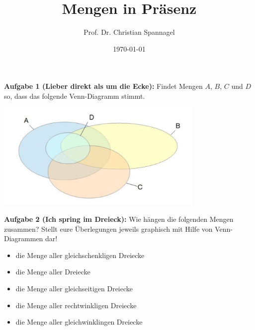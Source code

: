 \documentclass{../cssheet}
\title{Mengen in Präsenz}
\author{Prof. Dr. Christian Spannagel}
\date{\today}
\begin{document}
\printtitle

\vspace*{10mm}


\textbf{Aufgabe 1 (Lieber direkt als um die Ecke):}  Findet Mengen $A$, $B$, $C$ und $D$ so, dass das folgende Venn-Diagramm stimmt.

\begin{center}
\includegraphics[width=10cm]{venn.png}
\end{center}


\textbf{Aufgabe 2 (Ich spring im Dreieck):} Wie hängen die folgenden Mengen zusammen?
Stellt eure Überlegungen jeweils graphisch mit Hilfe von Venn-Diagrammen dar!

\begin{itemize}
\item die Menge aller gleichschenkligen Dreiecke
\item die Menge aller Dreiecke
\item die Menge aller gleichseitigen Dreiecke
\item die Menge aller rechtwinkligen Dreiecke
\item die Menge aller gleichwinklingen Dreiecke
\end{itemize}

\vspace*{10mm}
\printlicense

\printsocials
\end{document}
